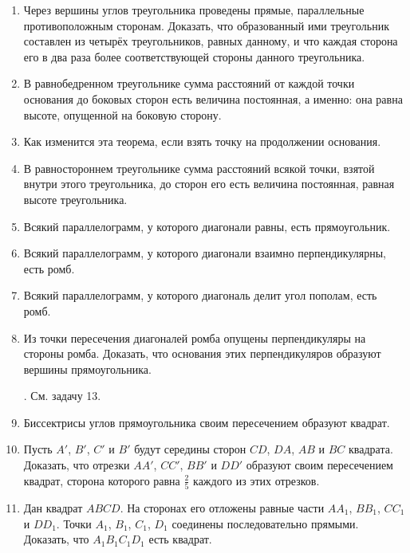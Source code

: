 {\begin{enumerate}[noitemsep]
\item
Через вершины углов треугольника проведены прямые, параллельные противоположным сторонам.
Доказать, что образованный ими треугольник составлен из четырёх треугольников, равных данному, и что каждая сторона его в два раза более соответствующей стороны данного треугольника.

\item
В равнобедренном треугольнике сумма расстояний от каждой точки основания до боковых сторон есть величина постоянная, а именно:
она равна высоте, опущенной на боковую сторону.

\item
Как изменится эта теорема, если взять точку на продолжении основания.

\item
В равностороннем треугольнике сумма расстояний всякой точки, взятой внутри этого треугольника, до сторон его есть величина постоянная, равная высоте треугольника.

\item
Всякий параллелограмм, у которого диагонали равны, есть прямоугольник.

\item
Всякий параллелограмм, у которого диагонали взаимно перпендикулярны, есть ромб.

\item
Всякий параллелограмм, у которого диагональ делит угол пополам, есть ромб.

\item
Из точки пересечения диагоналей ромба опущены перпендикуляры на стороны ромба.
Доказать, что основания этих перпендикуляров образуют вершины прямоугольника.

\smallskip
{}.
См.
задачу 13.

\item
Биссектрисы углов прямоугольника своим пересечением образуют квадрат.

\item
Пусть $A'$, $B'$, $C'$ и $B'$ будут середины сторон $CD$, $DA$, $AB$ и $BC$ квадрата.
Доказать, что отрезки $AA'$, $CC'$, $BB'$ и $DD'$ образуют своим пересечением квадрат, сторона которого равна $\tfrac25$ каждого из этих отрезков.

\item
Дан квадрат $ABCD$.
На сторонах его отложены равные части $AA_1$, $BB_1$, $CC_1$ и $DD_1$.
Точки $A_1$, $B_1$, $C_1$, $D_1$ соединены последовательно прямыми.
Доказать, что $A_1B_1C_1D_1$ есть квадрат.


\end{enumerate}}
